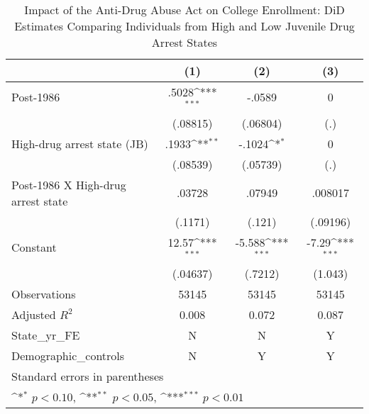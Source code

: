 \begin{table}[htbp]\centering
\def\sym#1{\ifmmode^{#1}\else\(^{#1}\)\fi}
\caption{Impact of the Anti-Drug Abuse Act on College Enrollment: DiD Estimates Comparing Individuals from High and Low Juvenile Drug Arrest States}
\begin{tabular}{l*{3}{c}}
\hline\hline
                    &\multicolumn{1}{c}{(1)}         &\multicolumn{1}{c}{(2)}         &\multicolumn{1}{c}{(3)}         \\
\hline
Post-1986           &       .5028\sym{***}&      -.0589         &           0         \\
                    &    (.08815)         &    (.06804)         &         (.)         \\
[1em]
High-drug arrest state (JB)&       .1933\sym{**} &      -.1024\sym{*}  &           0         \\
                    &    (.08539)         &    (.05739)         &         (.)         \\
[1em]
Post-1986 X High-drug arrest state&      .03728         &      .07949         &     .008017         \\
                    &     (.1171)         &      (.121)         &    (.09196)         \\
[1em]
Constant            &       12.57\sym{***}&      -5.588\sym{***}&       -7.29\sym{***}\\
                    &    (.04637)         &     (.7212)         &     (1.043)         \\
\hline
Observations        &       53145         &       53145         &       53145         \\
Adjusted \(R^{2}\)  &       0.008         &       0.072         &       0.087         \\
State\_yr\_FE         &           N         &           N         &           Y         \\
Demographic\_controls&           N         &           Y         &           Y         \\
\hline\hline
\multicolumn{4}{l}{\footnotesize Standard errors in parentheses}\\
\multicolumn{4}{l}{\footnotesize \sym{*} \(p<0.10\), \sym{**} \(p<0.05\), \sym{***} \(p<0.01\)}\\
\end{tabular}
\end{table}
